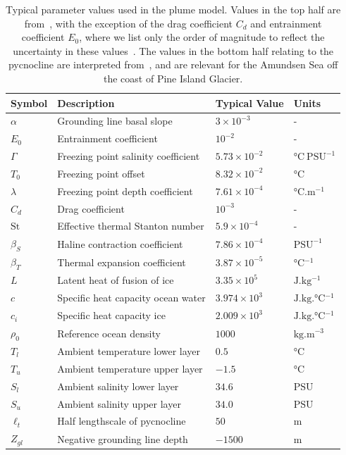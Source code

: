 \documentclass[openacc]{rsproca_new}%
\begin{document}
\begin{table}[!h]
\caption{Typical parameter values used in the plume model. Values in the top half are from~\cite{Jenkins1991JGeophysResOceans}, with the exception of the drag coefficient $C_d$ and entrainment coefficient $E_0$, where we list only the order of magnitude to reflect the uncertainty in these values~\citep{Hewitt2020AnnRevFlu}. The values in the bottom half relating to the pycnocline are interpreted from~\cite{Jenkins2018NatureGeo}, and are relevant for the Amundsen Sea off the coast of Pine Island Glacier.}\label{T:Constants}
\begin{center}
\begin{tabular}{llll}%
\hline
Symbol & Description & Typical Value & Units \\
\hline
$\alpha$ &Grounding line basal slope &$3\times 10^{-3}$ &- \\
$E_0$   & Entrainment coefficient    & $10^{-2}$ & -       \\
$\Gamma$      & Freezing point salinity coefficient & $5.73 \times 10^{-2}	$    	  &  $\si{\celsius}~\text{PSU}^{-1}$     \\
$T_0$      & Freezing point offset & $8.32 \times 10^{-2}	$    	  &  $\si{ \celsius}$     \\
$\lambda$      & Freezing point depth coefficient & $7.61 \times 10^{-4}	$    	  &  $\si{\celsius . \meter^{-1}}$     \\
$C_d$ & Drag coefficient & $10^{-3}$ & - \\
$\mathrm{St}$ & Effective thermal Stanton number & $5.9 \times 10^{-4}$ & -\\
$\beta_S$ & Haline contraction coefficient & $7.86 \times 10^{-4} $ & $\text{PSU}^{-1}$ \\
$\beta_T$ & Thermal expansion coefficient & $3.87\times 10^{-5}$ & $\si{\celsius^{-1}}$ \\
$L$ & Latent heat of fusion of ice & $3.35 \times 10^5 $& $\si{\joule . \kg^{-1}}$\\
$c$ & Specific heat capacity ocean water & $3.974 \times 10^3$ & $\si{\joule .\kilogram .\celsius^{-1}}$\\
$c_i$ & Specific heat capacity ice & $2.009 \times 10^3$ & $\si{\joule . \kilogram .\celsius^{-1}}$\\

$\rho_0$ &  Reference ocean density & $1000$ & $\si{\kilogram . \meter^{-3}}$\\
$T_{l}$ & Ambient temperature lower layer &$0.5$        &  $\si{ \celsius}$   \\
$T_{u}$ & Ambient temperature upper layer &$-1.5$        &  $\si{ \celsius}$  \\
$S_{l}$ & Ambient salinity lower layer &$34.6$        &  $\text{PSU}$   \\
$S_{u}$ & Ambient salinity upper layer &$34.0$        &  $\text{PSU}$  \\
$\ell_t$ & Half lengthscale of pycnocline & $50$ & $\si{\meter}$\\
$Z_{gl}$ & Negative grounding line depth & $-1500$ & $\si{\meter}$\\


\end{tabular}
\end{center}
\end{table}
\end{document}
